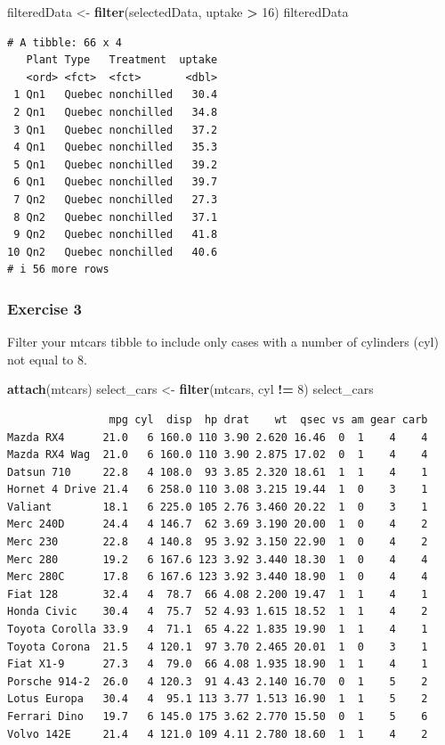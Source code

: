 \documentclass[
]{article}
\newenvironment{Shaded}{\begin{snugshade}}{\end{snugshade}}
\newcommand{\DecValTok}[1]{\textcolor[rgb]{0.00,0.00,0.81}{#1}}
\newcommand{\FunctionTok}[1]{\textcolor[rgb]{0.13,0.29,0.53}{\textbf{#1}}}
\newcommand{\NormalTok}[1]{#1}
\newcommand{\OtherTok}[1]{\textcolor[rgb]{0.56,0.35,0.01}{#1}}
\newcommand{\SpecialCharTok}[1]{\textcolor[rgb]{0.81,0.36,0.00}{\textbf{#1}}}
\begin{document}
\begin{Shaded}
\begin{Highlighting}[]
\NormalTok{filteredData }\OtherTok{\textless{}{-}} \FunctionTok{filter}\NormalTok{(selectedData, uptake }\SpecialCharTok{\textgreater{}} \DecValTok{16}\NormalTok{)}
\NormalTok{filteredData      }
\end{Highlighting}
\end{Shaded}

\begin{verbatim}
# A tibble: 66 x 4
   Plant Type   Treatment  uptake
   <ord> <fct>  <fct>       <dbl>
 1 Qn1   Quebec nonchilled   30.4
 2 Qn1   Quebec nonchilled   34.8
 3 Qn1   Quebec nonchilled   37.2
 4 Qn1   Quebec nonchilled   35.3
 5 Qn1   Quebec nonchilled   39.2
 6 Qn1   Quebec nonchilled   39.7
 7 Qn2   Quebec nonchilled   27.3
 8 Qn2   Quebec nonchilled   37.1
 9 Qn2   Quebec nonchilled   41.8
10 Qn2   Quebec nonchilled   40.6
# i 56 more rows
\end{verbatim}

\subsubsection{Exercise 3}\label{exercise-3}

Filter your mtcars tibble to include only cases with a number of
cylinders (cyl) not equal to 8.

\begin{Shaded}
\begin{Highlighting}[]
\FunctionTok{attach}\NormalTok{(mtcars)}
\NormalTok{select\_cars }\OtherTok{\textless{}{-}} \FunctionTok{filter}\NormalTok{(mtcars, cyl }\SpecialCharTok{!=} \DecValTok{8}\NormalTok{)}
\NormalTok{select\_cars}
\end{Highlighting}
\end{Shaded}

\begin{verbatim}
                mpg cyl  disp  hp drat    wt  qsec vs am gear carb
Mazda RX4      21.0   6 160.0 110 3.90 2.620 16.46  0  1    4    4
Mazda RX4 Wag  21.0   6 160.0 110 3.90 2.875 17.02  0  1    4    4
Datsun 710     22.8   4 108.0  93 3.85 2.320 18.61  1  1    4    1
Hornet 4 Drive 21.4   6 258.0 110 3.08 3.215 19.44  1  0    3    1
Valiant        18.1   6 225.0 105 2.76 3.460 20.22  1  0    3    1
Merc 240D      24.4   4 146.7  62 3.69 3.190 20.00  1  0    4    2
Merc 230       22.8   4 140.8  95 3.92 3.150 22.90  1  0    4    2
Merc 280       19.2   6 167.6 123 3.92 3.440 18.30  1  0    4    4
Merc 280C      17.8   6 167.6 123 3.92 3.440 18.90  1  0    4    4
Fiat 128       32.4   4  78.7  66 4.08 2.200 19.47  1  1    4    1
Honda Civic    30.4   4  75.7  52 4.93 1.615 18.52  1  1    4    2
Toyota Corolla 33.9   4  71.1  65 4.22 1.835 19.90  1  1    4    1
Toyota Corona  21.5   4 120.1  97 3.70 2.465 20.01  1  0    3    1
Fiat X1-9      27.3   4  79.0  66 4.08 1.935 18.90  1  1    4    1
Porsche 914-2  26.0   4 120.3  91 4.43 2.140 16.70  0  1    5    2
Lotus Europa   30.4   4  95.1 113 3.77 1.513 16.90  1  1    5    2
Ferrari Dino   19.7   6 145.0 175 3.62 2.770 15.50  0  1    5    6
Volvo 142E     21.4   4 121.0 109 4.11 2.780 18.60  1  1    4    2
\end{verbatim}
\end{document}
